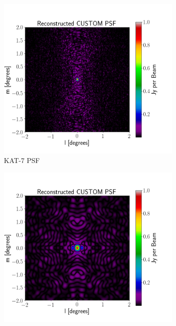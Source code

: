 \begin{figure}[H]
  \centering
  \begin{subfigure}[b]{0.49\textwidth}
    \includegraphics[width=\textwidth]{images/KAT_7_PSF.png}
    \caption{KAT-7 PSF}
    \label{fig:1}
  \end{subfigure}
  \begin{subfigure}[b]{0.49\textwidth}
    \includegraphics[width=\textwidth]{images/HERA_19_PSF.png}

\end{subfigure}
\end{figure}

